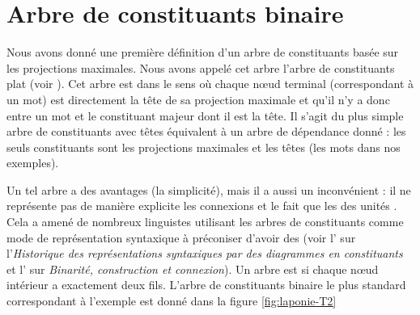 \section{Arbre de constituants binaire}\label{sec:3.4.14}

Nous avons donné une première définition d’un arbre de constituants basée sur les projections maximales. Nous avons appelé cet arbre l’arbre de constituants plat (voir ). Cet arbre est  dans le sens où chaque nœud terminal (correspondant à un mot) est directement la tête de sa projection maximale et qu’il n’y a donc  entre un mot et le constituant majeur dont il est la tête. Il s’agit du plus simple arbre de constituants avec têtes équivalent à un arbre de dépendance donné : les seuls constituants sont les projections maximales et les têtes (les mots dans nos exemples).

Un tel arbre a des avantages (la simplicité), mais il a aussi un inconvénient : il ne représente pas de manière explicite les connexions et le fait que les  des unités . Cela a amené de nombreux linguistes utilisant les arbres de constituants comme mode de représentation syntaxique à préconiser d’avoir des  (voir l' sur l’\textit{Historique des représentations syntaxiques par des diagrammes en constituants} et l' sur \textit{Binarité, construction et connexion}). Un arbre est  si chaque nœud intérieur a exactement deux fils. L’arbre de constituants binaire le plus standard correspondant à l'exemple  est donné dans la figure \ref{fig:laponie-T2}

